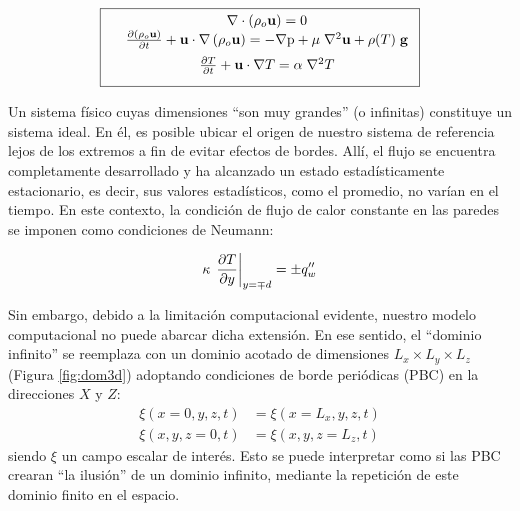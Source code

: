 \begin{equation}
        \boxed{ \begin{array}{lcc}
              &  \nabla \cdot \left( \rho_o \mathbf{u} \right) = 0 \\
              \vspace*{2mm}
              &  \frac{\partial \left( \rho_o \mathbf{u} \right)}{\partial t} + \mathbf{u} \cdot \nabla  \left( \rho_o \mathbf{u} \right) = -\nabla \text{p} + \mu \hspace{1mm} {\nabla}^2 \mathbf{u}  + \rho(T) \hspace{1mm} \mathbf{g} \\
              \vspace*{2mm}
              &  \frac{\partial T}{\partial t} + \mathbf{u} \cdot \nabla T =  \alpha \hspace{1mm} \nabla^2 T  \\
             \end{array}
               }
             \label{eq:gob_system}
\end{equation}

Un sistema físico cuyas dimensiones ``son muy grandes'' (o infinitas) constituye un sistema ideal. En él, es posible ubicar el origen de nuestro sistema de referencia lejos de los extremos a fin de evitar efectos de bordes. Allí, el flujo se encuentra completamente desarrollado y ha alcanzado un estado estadísticamente estacionario, es decir, sus valores estadísticos, como el promedio, no varían en el tiempo. En este contexto, la condición de flujo de calor constante en las paredes se imponen como condiciones de Neumann:

\begin{equation}
\kappa \hspace{0.5mm} \left. \frac{\partial T}{\partial y} \right\vert_{y=\mp d} = \pm q''_w
\label{eq:neumann}
\end{equation}

Sin embargo, debido a la limitación computacional evidente, nuestro modelo computacional no puede abarcar dicha extensión. En ese sentido, el ``dominio infinito'' se reemplaza con un dominio acotado de dimensiones $L_x \times L_y \times L_z$ (Figura \ref{fig:dom3d}) adoptando condiciones de borde periódicas (PBC) en la direcciones $X$ y $Z$:
\begin{align}
\xi(x=0,y,z,t) &= \xi(x=L_x,y,z,t) \\ 
\xi(x,y,z=0,t) &= \xi(x,y,z=L_z,t)
\end{align}
siendo $\xi$ un campo escalar de interés. Esto se puede interpretar como si las PBC crearan ``la ilusión'' de un dominio infinito, mediante la repetición de este dominio finito en el espacio.

